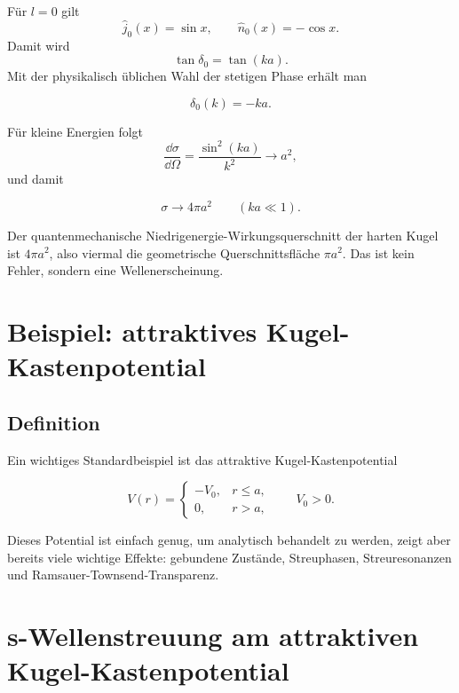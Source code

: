 Für \(l=0\) gilt
\[
    \hat j_0(x)=\sin x,
    \qquad
    \hat n_0(x)=-\cos x.
\]
Damit wird
\[
    \tan\delta_0=\tan(ka).
\]
Mit der physikalisch üblichen Wahl der stetigen Phase erhält man
\begin{formulabox}
\[
    \delta_0(k)=-ka.
\]
\end{formulabox}
Für kleine Energien folgt
\[
    \frac{\dd\sigma}{\dd\Omega}
    =\frac{\sin^2(ka)}{k^2}\to a^2,
\]
und damit
\begin{formulabox}
\[
    \sigma\to 4\pi a^2
    \qquad (ka\ll 1).
\]
\end{formulabox}

\begin{warningbox}
Der quantenmechanische Niedrigenergie-Wirkungsquerschnitt der harten Kugel ist \(4\pi a^2\), also viermal die geometrische Querschnittsfläche \(\pi a^2\). Das ist kein Fehler, sondern eine Wellenerscheinung.
\end{warningbox}

\section{Beispiel: attraktives Kugel-Kastenpotential}

\subsection{Definition}

Ein wichtiges Standardbeispiel ist das attraktive Kugel-Kastenpotential
\begin{definitionbox}
\[
    V(r)=
    \begin{cases}
        -V_0, & r\le a,\\
        0, & r>a,
    \end{cases}
    \qquad V_0>0.
\]
\end{definitionbox}

Dieses Potential ist einfach genug, um analytisch behandelt zu werden, zeigt aber bereits viele wichtige Effekte: gebundene Zustände, Streuphasen, Streuresonanzen und Ramsauer-Townsend-Transparenz.

\section{s-Wellenstreuung am attraktiven Kugel-Kastenpotential}


